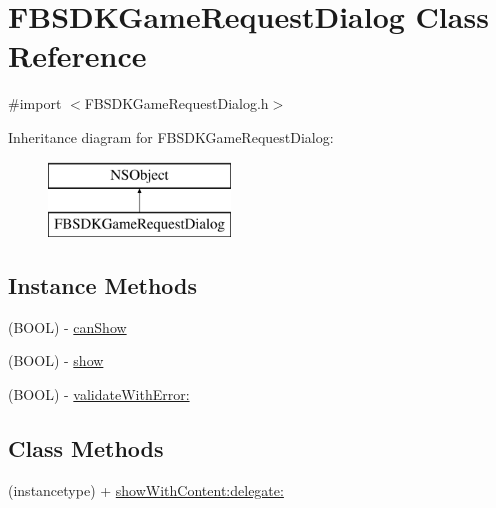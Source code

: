 \hypertarget{interface_f_b_s_d_k_game_request_dialog}{}\section{F\+B\+S\+D\+K\+Game\+Request\+Dialog Class Reference}
\label{interface_f_b_s_d_k_game_request_dialog}


{\ttfamily \#import $<$F\+B\+S\+D\+K\+Game\+Request\+Dialog.\+h$>$}

Inheritance diagram for F\+B\+S\+D\+K\+Game\+Request\+Dialog\+:\begin{figure}[H]
\begin{center}
\leavevmode
\includegraphics[height=2.000000cm]{interface_f_b_s_d_k_game_request_dialog}
\end{center}
\end{figure}
\subsection*{Instance Methods}
\begin{DoxyCompactItemize}
\item 
(B\+O\+O\+L) -\/ \hyperlink{interface_f_b_s_d_k_game_request_dialog_a12864871d0d4e6c9bb108a66144f8e1f}{can\+Show}
\item 
(B\+O\+O\+L) -\/ \hyperlink{interface_f_b_s_d_k_game_request_dialog_aa92ed48428c528e6bc2ebaa18793df0d}{show}
\item 
(B\+O\+O\+L) -\/ \hyperlink{interface_f_b_s_d_k_game_request_dialog_a7d32c3e433a913b18a768fc521315264}{validate\+With\+Error\+:}
\end{DoxyCompactItemize}
\subsection*{Class Methods}
\begin{DoxyCompactItemize}
\item 
(instancetype) + \hyperlink{interface_f_b_s_d_k_game_request_dialog_ae9560be075b2e36fcb134eda472e466a}{show\+With\+Content\+:delegate\+:}
\end{DoxyCompactItemize}
